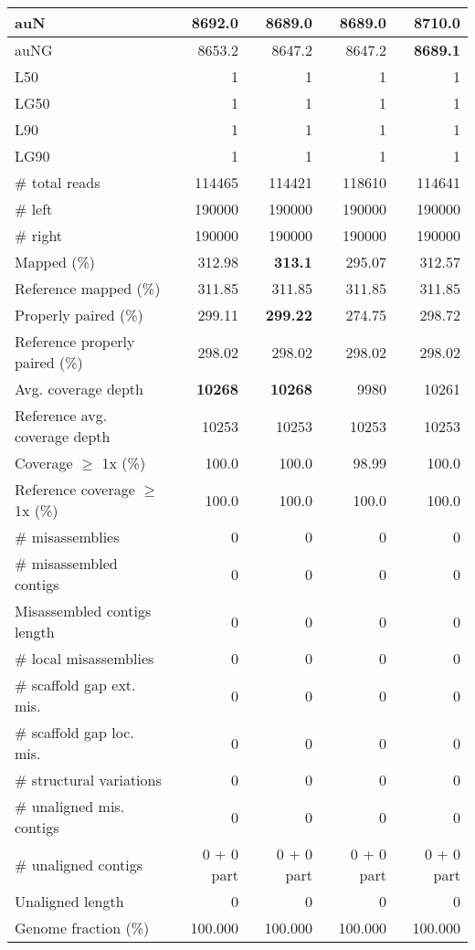 \documentclass[12pt,a4paper]{article}
\begin{document}
\begin{table}[ht]
\begin{center}
\begin{tabular}{|l*{4}{|r}|}
auN & 8692.0 & 8689.0 & 8689.0 & {\bf 8710.0} \\ \hline
auNG & 8653.2 & 8647.2 & 8647.2 & {\bf 8689.1} \\ \hline
L50 & 1 & 1 & 1 & 1 \\ \hline
LG50 & 1 & 1 & 1 & 1 \\ \hline
L90 & 1 & 1 & 1 & 1 \\ \hline
LG90 & 1 & 1 & 1 & 1 \\ \hline
\# total reads & 114465 & 114421 & 118610 & 114641 \\ \hline
\# left & 190000 & 190000 & 190000 & 190000 \\ \hline
\# right & 190000 & 190000 & 190000 & 190000 \\ \hline
Mapped (\%) & 312.98 & {\bf 313.1} & 295.07 & 312.57 \\ \hline
Reference mapped (\%) & 311.85 & 311.85 & 311.85 & 311.85 \\ \hline
Properly paired (\%) & 299.11 & {\bf 299.22} & 274.75 & 298.72 \\ \hline
Reference properly paired (\%) & 298.02 & 298.02 & 298.02 & 298.02 \\ \hline
Avg. coverage depth & {\bf 10268} & {\bf 10268} & 9980 & 10261 \\ \hline
Reference avg. coverage depth & 10253 & 10253 & 10253 & 10253 \\ \hline
Coverage $\geq$ 1x (\%) & 100.0 & 100.0 & 98.99 & 100.0 \\ \hline
Reference coverage $\geq$ 1x (\%) & 100.0 & 100.0 & 100.0 & 100.0 \\ \hline
\# misassemblies & 0 & 0 & 0 & 0 \\ \hline
\# misassembled contigs & 0 & 0 & 0 & 0 \\ \hline
Misassembled contigs length & 0 & 0 & 0 & 0 \\ \hline
\# local misassemblies & 0 & 0 & 0 & 0 \\ \hline
\# scaffold gap ext. mis. & 0 & 0 & 0 & 0 \\ \hline
\# scaffold gap loc. mis. & 0 & 0 & 0 & 0 \\ \hline
\# structural variations & 0 & 0 & 0 & 0 \\ \hline
\# unaligned mis. contigs & 0 & 0 & 0 & 0 \\ \hline
\# unaligned contigs & 0 + 0 part & 0 + 0 part & 0 + 0 part & 0 + 0 part \\ \hline
Unaligned length & 0 & 0 & 0 & 0 \\ \hline
Genome fraction (\%) & 100.000 & 100.000 & 100.000 & 100.000 \\ \hline

\end{tabular}
\end{center}
\end{table}
\end{document}

